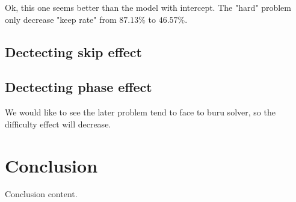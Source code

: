 \documentclass{article}
\begin{document}
Ok, this one seems better than the model with intercept. The "hard" problem only decrease "keep rate" 
from $87.13\%$ to $46.57\%$.

\subsection{Dectecting skip effect}

\subsection{Dectecting phase effect}

We would like to see the later problem tend to face to buru solver, so the difficulty effect will decrease.

\section{Conclusion}

Conclusion content.
\end{document}
